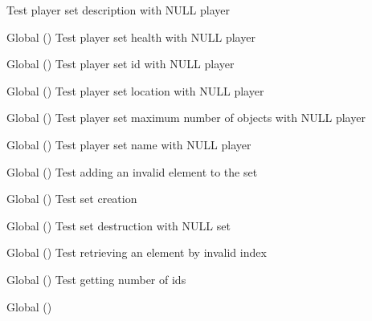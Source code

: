 \begin{DoxyRefList}
Test player set description with NULL player  
\item[Global \doxylink{player__test_8c_aca602481af023c45a1fe6825860aa184}{test2\+\_\+player\+\_\+set\+\_\+health} ()]\label{test__test000127}%
%
Test player set health with NULL player  
\item[Global \doxylink{player__test_8c_a3695e0896bc3d770290e6a691fa212f7}{test2\+\_\+player\+\_\+set\+\_\+id} ()]\label{test__test000119}%
%
Test player set id with NULL player  
\item[Global \doxylink{player__test_8c_a2c702753d9e2e3df9ef4abf2d1b9bc8d}{test2\+\_\+player\+\_\+set\+\_\+location} ()]\label{test__test000141}%
%
Test player set location with NULL player  
\item[Global \doxylink{player__test_8c_aebb4907ff20d7692475a1f599182e5de}{test2\+\_\+player\+\_\+set\+\_\+max\+\_\+objs} ()]\label{test__test000153}%
%
Test player set maximum number of objects with NULL player  
\item[Global \doxylink{player__test_8c_a6e7ce8ff791f4bf63749df647a44263f}{test2\+\_\+player\+\_\+set\+\_\+name} ()]\label{test__test000123}%
%
Test player set name with NULL player  
\item[Global \doxylink{set__test_8c_a8f373a2609fb5770b0663e26df0cb7c4}{test2\+\_\+set\+\_\+add\+\_\+id} ()]\label{test__test000159}%
%
Test adding an invalid element to the set  
\item[Global \doxylink{set__test_8c_abed3d273788e23fc31ae7f5ed59277b9}{test2\+\_\+set\+\_\+create} ()]\label{test__test000155}%
%
Test set creation  
\item[Global \doxylink{set__test_8c_a8418524584e638fc6f2d03f726db61f1}{test2\+\_\+set\+\_\+destroy} ()]\label{test__test000157}%
%
Test set destruction with NULL set  
\item[Global \doxylink{set__test_8c_af868199a6847e38eab42e8363181f0ee}{test2\+\_\+set\+\_\+get\+\_\+id\+\_\+from\+\_\+index} ()]\label{test__test000167}%
%
Test retrieving an element by invalid index  
\item[Global \doxylink{set__test_8c_aaadf761f34e98a3a6d214cc2598ee852}{test2\+\_\+set\+\_\+get\+\_\+num\+\_\+ids} ()]\label{test__test000165}%
%
Test getting number of ids  
\item[Global \doxylink{set__test_8c_a27ba936110dfc23be0d0d3b9ebf07161}{test2\+\_\+set\+\_\+has\+\_\+id} ()]\label{test__test000163}%

\end{DoxyRefList}
